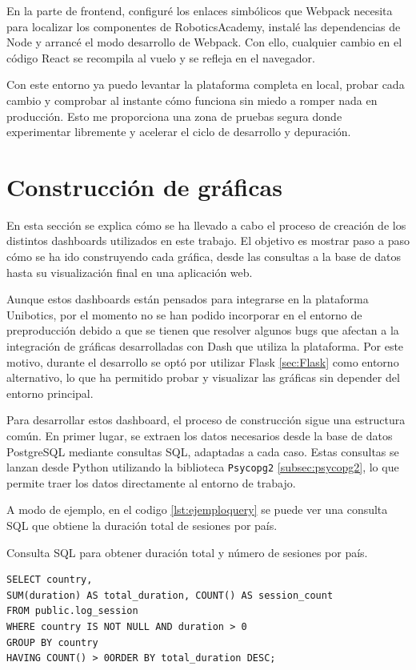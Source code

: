 \documentclass[a4paper, 12pt]{book}
\begin{document}
En la parte de frontend, configuré los enlaces simbólicos que Webpack necesita para localizar los componentes de RoboticsAcademy, instalé las dependencias de Node y arrancé el modo desarrollo de Webpack. Con ello, cualquier cambio en el código React se recompila al vuelo y se refleja en el navegador.

Con este entorno ya puedo levantar la plataforma completa en local, probar cada cambio y comprobar al instante cómo funciona sin miedo a romper nada en producción. Esto me proporciona una zona de pruebas segura donde experimentar libremente y acelerar el ciclo de desarrollo y depuración.

\section{Construcción de gráficas}

En esta sección se explica cómo se ha llevado a cabo el proceso de creación de los distintos dashboards utilizados en este trabajo. El objetivo es mostrar paso a paso cómo se ha ido construyendo cada gráfica, desde las consultas a la base de datos hasta su visualización final en una aplicación web.

Aunque estos dashboards están pensados para integrarse en la plataforma Unibotics, por el momento no se han podido incorporar en el entorno de preproducción debido a que se tienen que resolver algunos bugs que afectan a la integración de gráficas desarrolladas con Dash que utiliza la plataforma. Por este motivo, durante el desarrollo se optó por utilizar Flask \ref{sec:Flask} como entorno alternativo, lo que ha permitido probar y visualizar las gráficas sin depender del entorno principal.

Para desarrollar estos dashboard, el proceso de construcción sigue una estructura común. En primer lugar, se extraen los datos necesarios desde la base de datos PostgreSQL mediante consultas SQL, adaptadas a cada caso. Estas consultas se lanzan desde Python utilizando la biblioteca \texttt{Psycopg2} \ref{subsec:psycopg2}, lo que permite traer los datos directamente al entorno de trabajo.

A modo de ejemplo, en el codigo \ref{lst:ejemploquery} se puede ver una consulta SQL que obtiene la duración total de sesiones por país.

\begin{listing}[h!]
\caption{Consulta SQL para obtener duración total y número de sesiones por país.}{}
\label{lst:ejemploquery}
\begin{verbatim}
SELECT country,
SUM(duration) AS total_duration, COUNT() AS session_count
FROM public.log_session
WHERE country IS NOT NULL AND duration > 0
GROUP BY country
HAVING COUNT() > 0ORDER BY total_duration DESC;
\end{verbatim}
\end{listing}
\end{document}
